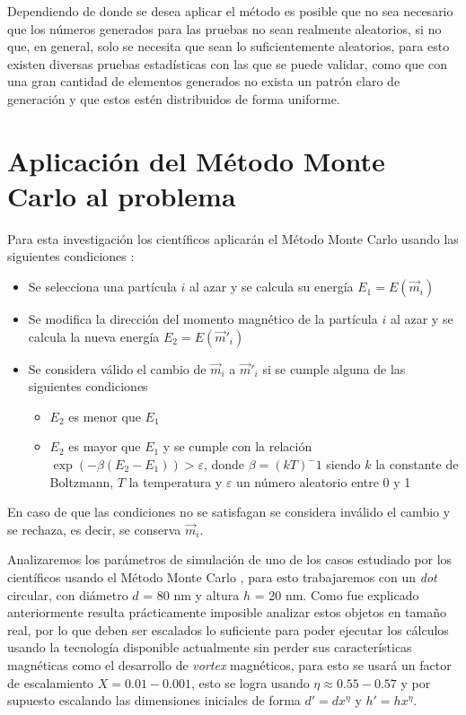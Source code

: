 Dependiendo de donde se desea aplicar el método es posible que no sea necesario que los números generados para las pruebas no sean realmente aleatorios, si no que, en general, solo se necesita que sean lo suficientemente aleatorios, para esto existen diversas pruebas estadísticas con las que se puede validar, como que con una gran cantidad de elementos generados no exista un patrón claro de generación y que estos estén distribuidos de forma uniforme.

\section{Aplicación del Método Monte Carlo al problema}

Para esta investigación los científicos aplicarán el Método Monte Carlo usando las siguientes condiciones \citep{TesisAllende}:

\begin{itemize}
 \item Se selecciona una partícula $i$ al azar y se calcula su energía $E_1 = E(\vec{m}_i)$
 \item Se modifica la dirección del momento magnético de la partícula $i$ al azar y se calcula la nueva energía $E_2 = E(\vec{m}'_i)$
 \item Se considera válido el cambio de $\vec{m}_i$ a $\vec{m}'_i$ si se cumple alguna de las siguientes condiciones
 \begin{itemize}
  \item $E_2$ es menor que $E_1$
  \item $E_2$ es mayor que $E_1$ y se cumple con la relación $\exp(-\beta(E_2 - E_1)) > \varepsilon$, donde $\beta = (kT)^-1$ siendo $k$ la constante de Boltzmann, $T$ la temperatura \citep{newmanb99} y $\varepsilon$ un número aleatorio entre 0 y 1
 \end{itemize}
\end{itemize}

En caso de que las condiciones no se satisfagan se considera inválido el cambio y se rechaza, es decir, se conserva $\vec{m}_i$.

Analizaremos los parámetros de simulación de uno de los casos estudiado por los científicos usando el Método Monte Carlo \citep{asymmetricMagneticDots}, para esto trabajaremos con un \emph{dot} circular, con diámetro $d$ = 80 nm y altura $h$ = 20 nm. Como fue explicado anteriormente resulta prácticamente imposible analizar estos objetos en tamaño real, por lo que deben ser escalados lo suficiente para poder ejecutar los cálculos usando la tecnología disponible actualmente sin perder sus características magnéticas como el desarrollo de \emph{vortex} magnéticos, para esto se usará un factor de escalamiento $X = 0.01 - 0.001$, esto se logra usando $\eta \approx 0.55 - 0.57$ y por supuesto escalando las dimensiones iniciales de forma $d' = dx^\eta$ y $h' = hx^\eta$.

